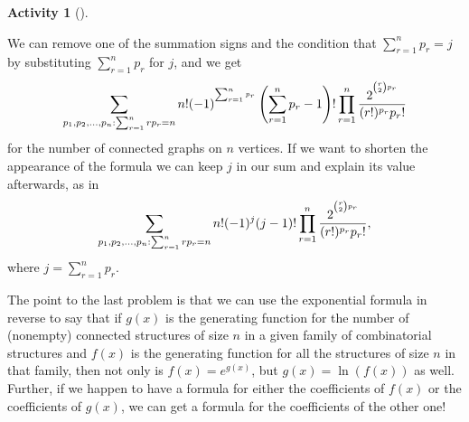 \documentclass[10pt,]{book}
\theoremstyle{plain}
\theoremstyle{definition}
\newtheorem{activity}[project]{Activity}
\numberwithin{equation}{chapter}
\begin{document}
\begin{activity}[]
\begin{enumerate}[label=(\alph*)]
%
\par
We can remove one of the summation signs and the condition that \(\sum_{r=1}^n p_r=j\) by substituting \(\sum_{r=1}^n p_r\) for \(j\), and we get%
\begin{equation*}
\sum_{{p_1,p_2,\ldots,p_n: \sum_{r=1}^n
rp_r =n }}{n!}(-1)^{^{\sum_{r=1}^n p_r}}\left(\sum_{r=1}^n p_r -1\right)!
\prod_{r=1}^n{2^{^{\binom{r}{2}p_r}}
\over (r!)^{p_r}p_r!}
\end{equation*}
for the number of connected graphs on \(n\) vertices. If we want to shorten the appearance of the formula we can keep \(j\) in our sum and explain its value afterwards, as in%
\begin{equation*}
\sum_{{p_1,p_2,\ldots,p_n: \sum_{r=1}^n
rp_r =n }}{n!}(-1)^j(j-1)!
\prod_{r=1}^n{2^{^{\binom{r}{2}p_r}}
\over (r!)^{p_r}p_r!},
\end{equation*}
where \(j=\sum_{r=1}^n p_r\).%

\end{enumerate}
\end{activity}
The point to the last problem is that we can use the exponential formula in reverse to say that if \(g(x)\) is the generating function for the number of (nonempty) connected structures of size \(n\) in a given family of combinatorial structures and \(f(x)\) is the generating function for all the structures of size \(n\) in that family, then not only is \(f(x) =
e^{g(x)}\), but \(g(x) = \ln(f(x))\) as well. Further, if we happen to have a formula for either the coefficients of \(f(x)\) or the coefficients of \(g(x)\), we can get a formula for the coefficients of the other one!%
\typeout{************************************************}
\typeout{************************************************}
\end{document}
